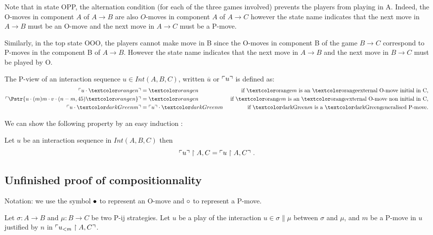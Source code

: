Note that in state OPP, the alternation condition (for each of the three games involved) prevents the players from playing in A. Indeed, the O-moves in component $A$ of $A\rightarrow B$ are also $O$-moves in component $A$ of $A\rightarrow C$ however the state name indicates that the next move in $A\rightarrow B$ must be an O-move and the next move in $A\rightarrow C$ must be a P-move.

Similarly, in the top state OOO, the players cannot make move in B since the O-moves in component B of the game $B\rightarrow C$ correspond to P-moves in the component B of $A\rightarrow B$. However the state name indicates that the next move in $A\rightarrow B$ and the next move in $B\rightarrow C$ must be played by O.



The P-view of an interaction sequence $u \in Int(A,B,C)$, written $\overline{u}$ or $\ulcorner u \urcorner$ is defined as:
\begin{align*}
\pview{u\cdot \extomove{n}} &= \extomove{n} &
\mbox{ if \extomove{$m$} is an \extomove{external O-move} initial in C,}\\
\pview{\Pstr{u\cdot (m)m\cdot v \cdot (n-m,45){\extomove{n}} }} &= \extomove{n} &\mbox{ if \extomove{$m$} is an \extomove{external O-move} non initial in C,}\\
\pview{u \cdot \extpmove{m}} &= \pview{u}\cdot \extpmove{m}  & \mbox{ if \extpmove{$m$} is a \extpmove{generalised P-move}.}\\ 
\end{align*}

We can show the following property by an easy induction :
\begin{lemma}
\label{lem:interaction_projection}
 Let $u$ be an interaction sequence in $Int(A,B,C)$ then
$$\ulcorner u \urcorner \upharpoonright A,C = \ulcorner u \upharpoonright A,C \urcorner \ .$$
\end{lemma}

\subsection{Unfinished proof of compositionnality} 
Notation: we use the symbol $\bullet$ to represent an O-move and $\circ$ to represent a P-move.
 

Let $\sigma : A \rightarrow B$ and $\mu : B \rightarrow C$ be two P-ij strategies. Let $u$ be a play of the interaction $u \in \sigma \| \mu$ between $\sigma$ and $\mu$,
and $m$ be a P-move in $u$
justified by $n$ in $\ulcorner u_{<m} \upharpoonright A , C \urcorner$.

